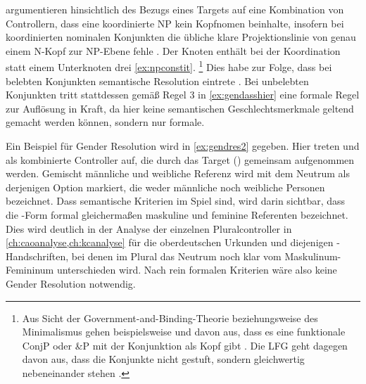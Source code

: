 \textcites[182--183]{wechslerzlatic2003}[576]{wechsler2009} argumentieren
hinsichtlich des Bezugs eines Targets auf eine Kombination von Controllern,
dass eine koordinierte NP kein Kopf\-nomen beinhalte, insofern bei
koordinierten nominalen Konjunkten die übliche klare Projektionslinie von genau
einem N-Kopf zur NP-Ebene fehle \autocites[183,
Anm.~85]{wechslerzlatic2003}[585, Anm.~7]{wechsler2009}. Der Knoten 
enthält bei der Koordination statt einem Unterknoten drei \cref{ex:npconstit}.%
%
	\footnote{Aus Sicht der Government-and-Binding-Theorie beziehungsweise des
	Minimalismus gehen beispielsweise
	\textcites{johannessen1998}{johannessen2005} und \citet{shen2019} davon aus, dass es
	eine funktionale ConjP oder \&P mit der Konjunktion als Kopf gibt
	\autocite[dagegen aber][]{borsley2005}. Die LFG geht dagegen davon aus,
	dass die Konjunkte nicht gestuft, sondern gleichwertig nebeneinander stehen
	\autocites[vgl.~z.\,B.][]{peterson2004}{sadlernordlinger2006}.}
%
Dies habe zur Folge, dass bei belebten Konjunkten semantische Resolution
eintrete \autocites[183]{wechslerzlatic2003}[576]{wechsler2009}. Bei unbelebten
Konjunkten tritt stattdessen gemäß Regel 3 in \cref{ex:gendasshier} eine
formale Regel zur Auflösung in Kraft, da hier keine semantischen
Geschlechtsmerkmale geltend gemacht werden können, sondern nur formale.

Ein Beispiel für Gender Resolution wird in \cref{ex:gendres2} gegeben. Hier
treten   und 
 als kombinierte Controller auf, die durch das
Target  (\NeutMF) gemeinsam aufgenommen werden. Gemischt männliche
und weibliche Referenz wird mit dem Neutrum als derjenigen Option markiert,
die weder männliche noch weibliche Personen bezeichnet. Dass semantische
Kriterien im Spiel sind, wird darin sichtbar, dass die -Form formal
gleichermaßen maskuline und feminine Referenten bezeichnet. Dies wird deutlich
in der Analyse der einzelnen Pluralcontroller in
\cref{ch:caoanalyse,ch:kcanalyse} für die oberdeutschen Urkunden und diejenigen
\KC{}-Handschriften, bei denen im Plural das Neutrum noch klar vom
Maskulinum-Femininum unterschieden wird. Nach rein formalen Kriterien wäre also
keine Gender Resolution notwendig.

